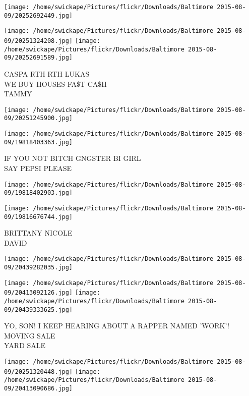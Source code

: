 \documentclass[10pt,letterpaper]{article}
\begin{document}
\texttt{[image: /home/swickape/Pictures/flickr/Downloads/Baltimore 2015-08-09/20252692449.jpg]}

\vspace{0.25in}
\texttt{[image: /home/swickape/Pictures/flickr/Downloads/Baltimore 2015-08-09/20251324208.jpg]}
\texttt{[image: /home/swickape/Pictures/flickr/Downloads/Baltimore 2015-08-09/20252691589.jpg]}

CASPA RTH RTH LUKAS\\
WE BUY HOUSES FA\$T CA\$H\\
TAMMY\\
\pagebreak

\texttt{[image: /home/swickape/Pictures/flickr/Downloads/Baltimore 2015-08-09/20251245900.jpg]}

\vspace{0.25in}
\texttt{[image: /home/swickape/Pictures/flickr/Downloads/Baltimore 2015-08-09/19818403363.jpg]}

IF YOU NOT BITCH GNGSTER BI GIRL\\
SAY PEPSI PLEASE\\
\pagebreak

\texttt{[image: /home/swickape/Pictures/flickr/Downloads/Baltimore 2015-08-09/19818402903.jpg]}

\vspace{0.25in}
\texttt{[image: /home/swickape/Pictures/flickr/Downloads/Baltimore 2015-08-09/19816676744.jpg]}

BRITTANY NICOLE\\
DAVID\\
\pagebreak

\texttt{[image: /home/swickape/Pictures/flickr/Downloads/Baltimore 2015-08-09/20439282035.jpg]}

\vspace{0.25in}
\texttt{[image: /home/swickape/Pictures/flickr/Downloads/Baltimore 2015-08-09/20413092126.jpg]}
\texttt{[image: /home/swickape/Pictures/flickr/Downloads/Baltimore 2015-08-09/20439333625.jpg]}

YO, SON!  I KEEP HEARING ABOUT A RAPPER NAMED 'WORK'!\\
MOVING SALE\\
YARD SALE\\
\pagebreak

\texttt{[image: /home/swickape/Pictures/flickr/Downloads/Baltimore 2015-08-09/20251320448.jpg]}
\texttt{[image: /home/swickape/Pictures/flickr/Downloads/Baltimore 2015-08-09/20413090686.jpg]}
\end{document}
